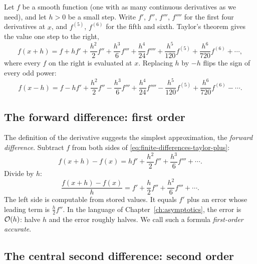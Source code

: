 Let $f$ be a smooth function (one with as many continuous derivatives as we need), and let $h>0$ be a small step. Write $f'$, $f''$, $f'''$, $f''''$ for the first four derivatives at $x$, and $f^{(5)}$, $f^{(6)}$ for the fifth and sixth. Taylor's theorem gives the value one step to the right,
\begin{equation}
f(x+h)=f+hf'+\frac{h^2}{2}f''+\frac{h^3}{6}f'''+\frac{h^4}{24}f''''+\frac{h^5}{120}f^{(5)}+\frac{h^6}{720}f^{(6)}+\cdots,
\label{eq:finite-differences-taylor-plus}
\end{equation}
where every $f$ on the right is evaluated at $x$. Replacing $h$ by $-h$ flips the sign of every odd power:
\begin{equation}
f(x-h)=f-hf'+\frac{h^2}{2}f''-\frac{h^3}{6}f'''+\frac{h^4}{24}f''''-\frac{h^5}{120}f^{(5)}+\frac{h^6}{720}f^{(6)}-\cdots.
\label{eq:finite-differences-taylor-minus}
\end{equation}

\subsection{The forward difference: first order}

The definition of the derivative suggests the simplest approximation, the \emph{forward difference}. Subtract $f$ from both sides of \eqref{eq:finite-differences-taylor-plus}:
\begin{equation*}
f(x+h)-f(x)=hf'+\frac{h^2}{2}f''+\frac{h^3}{6}f'''+\cdots.
\end{equation*}
Divide by $h$:
\begin{equation}
\frac{f(x+h)-f(x)}{h}=f'+\frac{h}{2}f''+\frac{h^2}{6}f'''+\cdots.
\label{eq:finite-differences-forward}
\end{equation}
The left side is computable from stored values. It equals $f'$ plus an error whose leading term is $\tfrac{h}{2}f''$. In the language of Chapter~\ref{ch:asymptotics}, the error is $\mathcal{O}(h)$: halve $h$ and the error roughly halves. We call such a formula \emph{first-order accurate}.

\subsection{The central second difference: second order}


